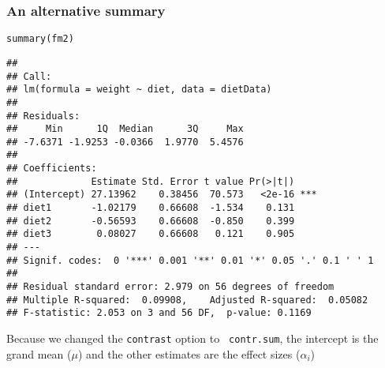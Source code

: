 \documentclass[color=usenames,dvipsnames]{beamer}\usepackage[]{graphicx}\usepackage[]{color}
\makeatletter
\newcommand{\hlstd}[1]{\textcolor[rgb]{0,0,0}{#1}}%
\newcommand{\hlkwd}[1]{\textcolor[rgb]{0.004,0.004,0.506}{#1}}%
\newenvironment{kframe}{%
 \def\at@end@of@kframe{}%
 \ifinner\ifhmode%
  \def\at@end@of@kframe{\end{minipage}}%
  \begin{minipage}{\columnwidth}%
 \fi\fi%
 \def\FrameCommand##1{\hskip\@totalleftmargin \hskip-\fboxsep
 \colorbox{shadecolor}{##1}\hskip-\fboxsep
     \hskip-\linewidth \hskip-\@totalleftmargin \hskip\columnwidth}%
 \MakeFramed {\advance\hsize-\width
   \@totalleftmargin\z@ \linewidth\hsize
   \@setminipage}}%
 {\par\unskip\endMakeFramed%
 \at@end@of@kframe}
\newenvironment{knitrout}{}{} %
\newcommand{\inr}[1]{\colorbox{inlinecolor}{\texttt{#1}}}
\makeatother
\begin{document}
\begin{frame}[fragile]
  \frametitle{An alternative summary}
  \scriptsize
\begin{knitrout}\tiny
{}\color{fgcolor}\begin{kframe}
\begin{alltt}
\hlkwd{summary}\hlstd{(fm2)}
\end{alltt}
\begin{verbatim}
## 
## Call:
## lm(formula = weight ~ diet, data = dietData)
## 
## Residuals:
##     Min      1Q  Median      3Q     Max 
## -7.6371 -1.9253 -0.0366  1.9770  5.4576 
## 
## Coefficients:
##             Estimate Std. Error t value Pr(>|t|)    
## (Intercept) 27.13962    0.38456  70.573   <2e-16 ***
## diet1       -1.02179    0.66608  -1.534    0.131    
## diet2       -0.56593    0.66608  -0.850    0.399    
## diet3        0.08027    0.66608   0.121    0.905    
## ---
## Signif. codes:  0 '***' 0.001 '**' 0.01 '*' 0.05 '.' 0.1 ' ' 1
## 
## Residual standard error: 2.979 on 56 degrees of freedom
## Multiple R-squared:  0.09908,	Adjusted R-squared:  0.05082 
## F-statistic: 2.053 on 3 and 56 DF,  p-value: 0.1169
\end{verbatim}
\end{kframe}
\end{knitrout}
 \pause
 {%
   Because we changed the \inr{contrast} option to {\tt
     contr.sum}, the intercept is the grand mean ($\mu$) and the other
   estimates are the effect sizes ($\alpha_i$) \\}
\end{frame}
\end{document}
